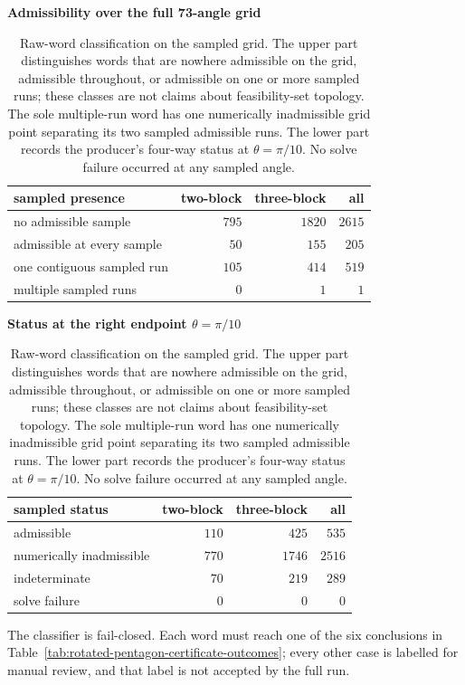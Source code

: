 \begin{table}[p]
\centering
\small
\textbf{Admissibility over the full 73-angle grid}\par\smallskip
\begin{tabular}{@{}lrrr@{}}
\toprule
sampled presence & two-block & three-block & all\\
\midrule
no admissible sample & \(795\) & \(1820\) & \(2615\)\\
admissible at every sample & \(50\) & \(155\) & \(205\)\\
one contiguous sampled run & \(105\) & \(414\) & \(519\)\\
multiple sampled runs & \(0\) & \(1\) & \(1\)\\
\bottomrule
\end{tabular}

\vspace{1.5em}
\textbf{Status at the right endpoint \(\theta=\pi/10\)}\par\smallskip
\begin{tabular}{@{}lrrr@{}}
\toprule
sampled status & two-block & three-block & all\\
\midrule
admissible & \(110\) & \(425\) & \(535\)\\
numerically inadmissible & \(770\) & \(1746\) & \(2516\)\\
indeterminate & \(70\) & \(219\) & \(289\)\\
solve failure & \(0\) & \(0\) & \(0\)\\
\bottomrule
\end{tabular}
\caption{Raw-word classification on the sampled grid.  The upper part
distinguishes words that are nowhere admissible on the grid, admissible
throughout, or admissible on one or more sampled runs; these classes are not
claims about feasibility-set topology.  The sole multiple-run word has
one numerically inadmissible grid point separating its two sampled admissible
runs.  The lower part records the producer's four-way status at
\(\theta=\pi/10\).  No solve failure occurred at any sampled angle.}
\label{tab:rotated-pentagon-sampled-presence}
\end{table}
\FloatBarrier

The classifier is fail-closed.  Each word must reach one of the six conclusions
in Table~\ref{tab:rotated-pentagon-certificate-outcomes}; every other case is
labelled for manual review, and that label is not accepted by the full run.

